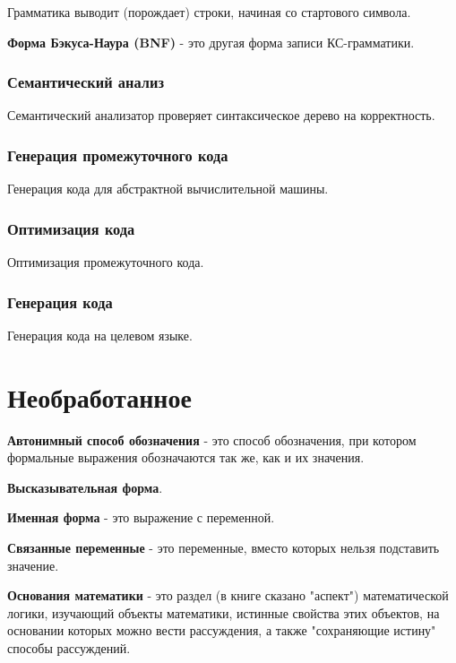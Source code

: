 \documentclass[oneside]{book}
\begin{document}
    Грамматика выводит (порождает) строки, начиная со стартового символа.

    \textbf{Форма Бэкуса-Наура (BNF)} - это другая форма записи КС-грамматики.

    \subsection{Семантический анализ}
    Семантический анализатор проверяет синтаксическое дерево на корректность.

    \subsection{Генерация промежуточного кода}
    Генерация кода для абстрактной вычислительной машины.

    \subsection{Оптимизация кода}
    Оптимизация промежуточного кода.

    \subsection{Генерация кода}
    Генерация кода на целевом языке.

    \chapter{Необработанное}
    \textbf{Автонимный способ обозначения} - это
    способ обозначения,
    при котором формальные выражения обозначаются так же,
    как и их значения.

    \textbf{Высказывательная форма}.

    \textbf{Именная форма} - это
    выражение с переменной.

    \textbf{Связанные переменные} - это
    переменные, вместо которых
    нельзя подставить значение.

    \textbf{Основания математики} - это
    раздел (в книге сказано "аспект")
    математической логики,
    изучающий объекты математики,
    истинные свойства этих объектов,
    на основании которых можно вести рассуждения,
    а также "сохраняющие истину" способы рассуждений.
\end{document}
